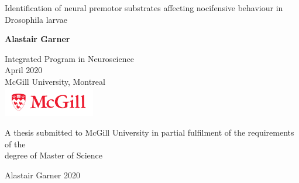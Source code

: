 \begin{titlepage}
  \begin{center}
    \vspace*{1cm}

    {\LARGE\textsf{Identification of neural premotor substrates affecting nocifensive behaviour in Drosophila larvae}\par}

    \vspace{2.0cm}
    
    {\large\textbf{Alastair Garner}\par}

    \vspace{2.0cm}
    
    Integrated Program in Neuroscience\\
    April 2020\\
    McGill University, Montreal\\

    \includegraphics[width=4cm]{./mcgill_sig_red.png}

    \vfill

    {A thesis submitted to McGill University in partial fulfilment of the requirements of the\\
    degree of Master of Science \par}

    \vspace{0.2cm}

    {\textcopyright Alastair Garner 2020 \par}
  \end{center} 
\end{titlepage}
